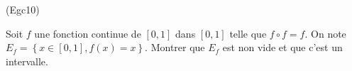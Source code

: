 \begin{tiny}(Egc10)\end{tiny}
Soit $f$ une fonction continue de $\left[ 0,1\right] $ dans $\left[0,1\right] $ telle que $f\circ f=f$. On note $E_{f}=\left\{ x\in \left[ 0,1\right] ,f(x)=x\right\} $. Montrer que $E_{f}$ est non vide et que c'est un intervalle.